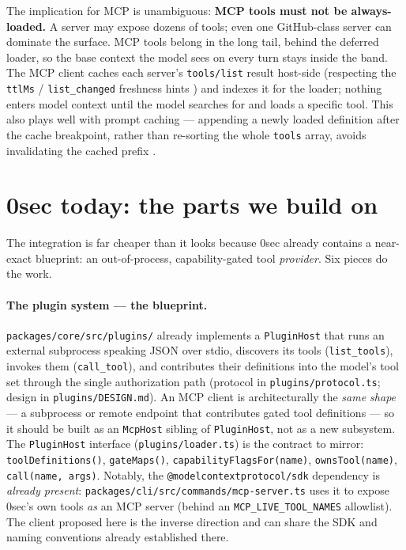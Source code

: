 \documentclass[11pt]{article}
\begin{document}
The implication for MCP is unambiguous: \textbf{MCP tools must not be
always-loaded.} A server may expose dozens of tools; even one GitHub-class
server can dominate the surface. MCP tools belong in the long tail, behind the
deferred loader, so the base context the model sees on every turn stays inside
the band. The MCP client caches each server's \texttt{tools/list} result
host-side (respecting the \texttt{ttlMs} / \texttt{list\_changed} freshness
hints \cite{mcp-clientbp}) and indexes it for the loader; nothing enters model
context until the model searches for and loads a specific tool. This also plays
well with prompt caching --- appending a newly loaded definition after the cache
breakpoint, rather than re-sorting the whole \texttt{tools} array, avoids
invalidating the cached prefix \cite{mcp-clientbp}.

\section{0sec today: the parts we build on}

The integration is far cheaper than it looks because 0sec already contains a
near-exact blueprint: an out-of-process, capability-gated tool \emph{provider}.
Six pieces do the work.

\paragraph{The plugin system --- the blueprint.} \texttt{packages/core/src/plugins/}
already implements a \texttt{PluginHost} that runs an external subprocess
speaking JSON over stdio, discovers its tools (\texttt{list\_tools}), invokes
them (\texttt{call\_tool}), and contributes their definitions into the model's
tool set through the single authorization path (protocol in
\texttt{plugins/protocol.ts}; design in \texttt{plugins/DESIGN.md}). An MCP client
is architecturally the \emph{same shape} --- a subprocess or remote endpoint that
contributes gated tool definitions --- so it should be built as an
\texttt{McpHost} sibling of \texttt{PluginHost}, not as a new subsystem. The
\texttt{PluginHost} interface (\texttt{plugins/loader.ts}) is the contract to
mirror: \texttt{toolDefinitions()}, \texttt{gateMaps()},
\texttt{capabilityFlagsFor(name)}, \texttt{ownsTool(name)},
\texttt{call(name, args)}. Notably, the \texttt{@modelcontextprotocol/sdk}
dependency is \emph{already present}: \texttt{packages/cli/src/commands/mcp-server.ts}
uses it to expose 0sec's own tools \emph{as} an MCP server (behind an
\texttt{MCP\_LIVE\_TOOL\_NAMES} allowlist). The client proposed here is the
inverse direction and can share the SDK and naming conventions already
established there.
\end{document}
